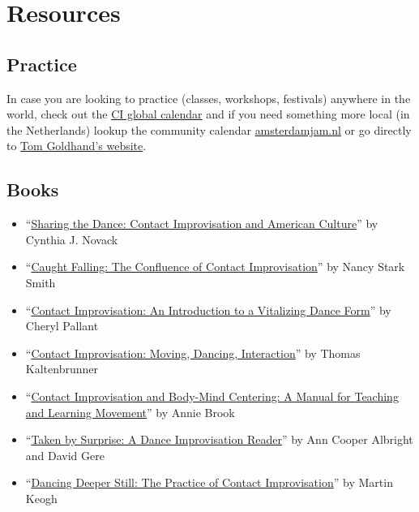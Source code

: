 \section{Resources}\label{sec:resources}

\subsection{Practice}\label{subsec:practice}

In case you are looking to practice (classes, workshops, festivals) anywhere in the world, check out the \href{https://ciglobalcalendar.net}{CI global calendar} and if you need something more local (in the Netherlands) lookup the community calendar \href{https://amsterdamjam.nl}{amsterdamjam.nl} or go directly to \href{https://tomgoldhand.com}{Tom Goldhand's website}.

\subsection{Books}\label{subsec:books}

\begin{itemize}
    \setlength\itemsep{0em}
    \item ``\href{https://www.amazon.com/Sharing-Dance-Improvisation-Directions-Anthropological/dp/0299124444}{Sharing the Dance: Contact Improvisation and American Culture}'' by Cynthia J. Novack
    \item ``\href{https://www.amazon.com/Caught-Falling-Confluence-Contact-Improvisation/dp/0937645095}{Caught Falling: The Confluence of Contact Improvisation}'' by Nancy Stark Smith
    \item ``\href{https://www.amazon.com/Contact-Improvisation-Introduction-Vitalizing-Dance/dp/0786426470}{Contact Improvisation: An Introduction to a Vitalizing Dance Form}'' by Cheryl Pallant
    \item ``\href{https://www.amazon.com/Contact-Improvisation-Dancing-Interaction-Introduction/dp/1841261386}{Contact Improvisation: Moving, Dancing, Interaction}'' by Thomas Kaltenbrunner
    \item ``\href{https://www.amazon.com/Improvisation-Body-Mind-Centering-Teaching-Learning/dp/0976044900}{Contact Improvisation and Body-Mind Centering: A Manual for Teaching and Learning Movement}'' by Annie Brook
    \item ``\href{https://www.amazon.com/Taken-Surprise-Dance-Improvisation-Reader/dp/0819566489}{Taken by Surprise: A Dance Improvisation Reader}'' by Ann Cooper Albright and David Gere
    \item ``\href{https://www.amazon.com/Dancing-Deeper-Still-Practice-Improvisation/dp/1775243044}{Dancing Deeper Still: The Practice of Contact Improvisation}'' by Martin Keogh
\end{itemize}

